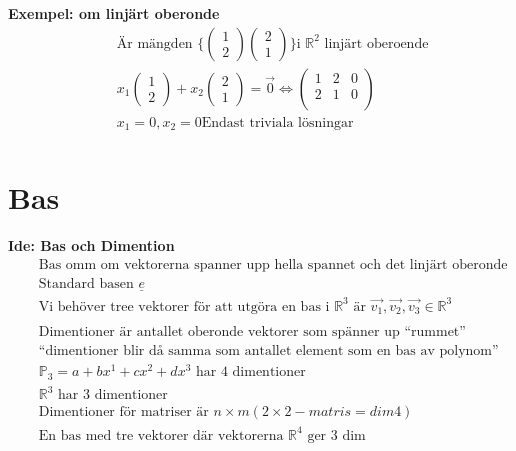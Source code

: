 \textbf{Exempel: om linjärt oberonde}
\begin{align*}
  &\quad  \text{Är mängden }  \Big\{
  \begin{pmatrix} 1 \\ 2  \end{pmatrix}
  \begin{pmatrix} 2 \\ 1  \end{pmatrix} \Big\}
  \text{i $\mathbb{R}^2$ linjärt oberoende}  \\
  &\quad
  x_1\begin{pmatrix} 1 \\ 2  \end{pmatrix} +
  x_2\begin{pmatrix} 2 \\ 1  \end{pmatrix} = \vec{0} 
  \Leftrightarrow
  \left(\begin{array}{cc|c}
    1   & 2  & 0  \\
    2   & 1  & 0  \\
  \end{array}\right) \\
  &\quad  x_1=0, x_2=0 \text{Endast triviala lösningar } \\
\end{align*}



\newpage

\section{Bas}
\textbf{Ide: Bas och Dimention}
\begin{align*}
  &\quad  \text{Bas omm om vektorerna spanner upp hella spannet och det linjärt oberonde} \\
  &\quad  \text{Standard basen } \underline{e} \\
  &\quad  \text{Vi behöver tree vektorer för att utgöra en bas i } \mathbb{R}^3 \text{ är }
  \vec{v_1}, \vec{v_2}, \vec{v_3} \in\mathbb{R}^3 \\
  &\quad  \\
  &\quad  \text{Dimentioner är antallet oberonde vektorer som spänner up ``rummet''} \\
  &\quad  \text{``dimentioner blir då samma som antallet element som en bas av polynom''} \\
  &\quad  \mathbb{P}_3 = a + bx^1 + cx^2 + dx^3 \text{ har 4 dimentioner} \\
  &\quad  \mathbb{R}^3 \text{ har 3 dimentioner} \\
  &\quad  \text{Dimentioner för matriser är } n\times m (2\times{2}-matris = dim 4) \\
  &\quad  \text{En bas med tre vektorer där vektorerna $\mathbb{R}^4$ ger 3 dim} \\
\end{align*}

